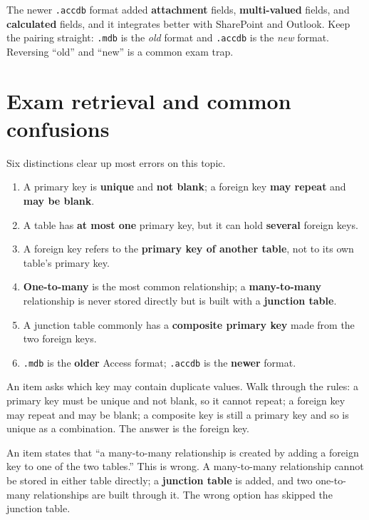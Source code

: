 The newer \texttt{.accdb} format added \textbf{attachment} fields,
\textbf{multi-valued} fields, and \textbf{calculated} fields, and it integrates
better with SharePoint and Outlook. Keep the pairing straight: \texttt{.mdb}
is the \emph{old} format and \texttt{.accdb} is the \emph{new} format.
Reversing ``old'' and ``new'' is a common exam trap.

\section{Exam retrieval and common confusions}
Six distinctions clear up most errors on this topic.
\begin{enumerate}
  \item A primary key is \textbf{unique} and \textbf{not blank}; a foreign key
    \textbf{may repeat} and \textbf{may be blank}.
  \item A table has \textbf{at most one} primary key, but it can hold
    \textbf{several} foreign keys.
  \item A foreign key refers to the \textbf{primary key of another table}, not
    to its own table's primary key.
  \item \textbf{One-to-many} is the most common relationship; a
    \textbf{many-to-many} relationship is never stored directly but is built
    with a \textbf{junction table}.
  \item A junction table commonly has a \textbf{composite primary key} made
    from the two foreign keys.
  \item \texttt{.mdb} is the \textbf{older} Access format; \texttt{.accdb} is
    the \textbf{newer} format.
\end{enumerate}

\begin{example}
An item asks which key may contain duplicate values. Walk through the rules: a
primary key must be unique and not blank, so it cannot repeat; a foreign key
may repeat and may be blank; a composite key is still a primary key and so is
unique as a combination. The answer is the foreign key.
\end{example}

\begin{example}
An item states that ``a many-to-many relationship is created by adding a
foreign key to one of the two tables.'' This is wrong. A many-to-many
relationship cannot be stored in either table directly; a \textbf{junction
table} is added, and two one-to-many relationships are built through it. The
wrong option has skipped the junction table.
\end{example}

